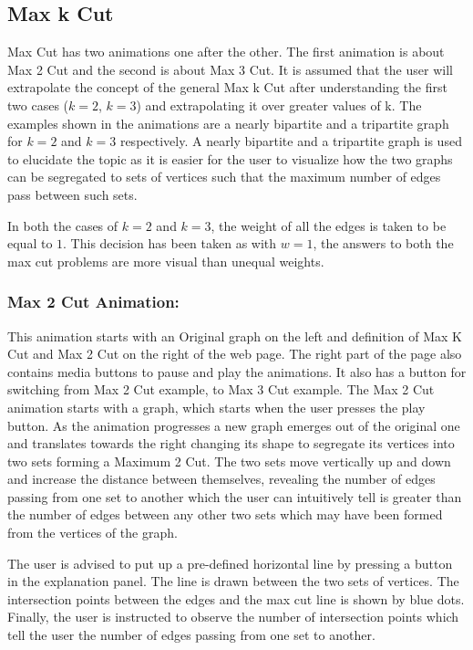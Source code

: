 \subsection{Max k Cut}
\label{story: maxkcut}
Max Cut has two animations one after the other. The first animation is about
Max 2 Cut and the second is about Max 3 Cut.  It is assumed that the user will
extrapolate the concept of the general Max k Cut after understanding the first
two cases ($k=2$, $k=3$) and extrapolating it over greater values of k.  The
examples shown in the animations are a nearly bipartite and a tripartite graph
for $k=2$ and $k=3$ respectively.  A nearly bipartite and a tripartite graph is
used to elucidate the topic as it is easier for the user to visualize how the
two graphs can be segregated to sets of vertices such that the maximum number
of edges pass between such sets.

In both the cases of $k=2$ and $k=3$, the weight of all the edges is taken to
be equal to $1$. This decision has been taken as with $w=1$, the answers to
both the max cut problems are more visual than unequal weights.

\subsubsection{Max 2 Cut Animation:} 
\label{story: max2cut}
This animation starts with an Original graph on the left and definition of Max K Cut and
Max 2 Cut on the right of the web page. The right part of the page also
contains media buttons to pause and play the animations. It also has a button
for switching from Max 2 Cut example, to Max 3 Cut example.  The Max 2 Cut
animation starts with a graph, which starts when the user presses the play
button. As the animation progresses a new graph emerges out of the original
one and translates towards the right changing its shape to segregate its
vertices into two sets forming a Maximum 2 Cut. The two sets move vertically up
and down and increase the distance between themselves, revealing the
number of edges passing from one set to another which the user can intuitively
tell is greater than the number of edges between any other two sets
which may have been formed from the vertices of the graph.

The user is advised to put up a pre-defined horizontal line by pressing a
button in the explanation panel. The line is drawn between the two sets of
vertices.  The intersection points between the edges and the max cut line is
shown by blue dots. Finally, the user is instructed to observe the number of intersection
points which tell the user the number of edges passing from one set to another.

